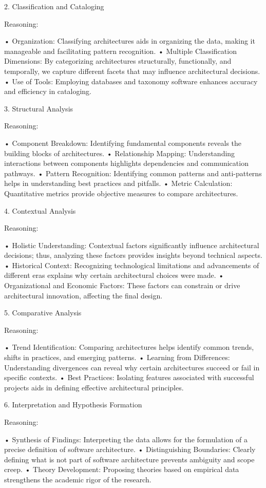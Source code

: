 2. Classification and Cataloging

Reasoning:

	•	Organization: Classifying architectures aids in organizing the data, making it manageable and facilitating pattern recognition.
	•	Multiple Classification Dimensions: By categorizing architectures structurally, functionally, and temporally, we capture different facets that may influence architectural decisions.
	•	Use of Tools: Employing databases and taxonomy software enhances accuracy and efficiency in cataloging.

3. Structural Analysis

Reasoning:

	•	Component Breakdown: Identifying fundamental components reveals the building blocks of architectures.
	•	Relationship Mapping: Understanding interactions between components highlights dependencies and communication pathways.
	•	Pattern Recognition: Identifying common patterns and anti-patterns helps in understanding best practices and pitfalls.
	•	Metric Calculation: Quantitative metrics provide objective measures to compare architectures.

4. Contextual Analysis

Reasoning:

	•	Holistic Understanding: Contextual factors significantly influence architectural decisions; thus, analyzing these factors provides insights beyond technical aspects.
	•	Historical Context: Recognizing technological limitations and advancements of different eras explains why certain architectural choices were made.
	•	Organizational and Economic Factors: These factors can constrain or drive architectural innovation, affecting the final design.

5. Comparative Analysis

Reasoning:

	•	Trend Identification: Comparing architectures helps identify common trends, shifts in practices, and emerging patterns.
	•	Learning from Differences: Understanding divergences can reveal why certain architectures succeed or fail in specific contexts.
	•	Best Practices: Isolating features associated with successful projects aids in defining effective architectural principles.

6. Interpretation and Hypothesis Formation

Reasoning:

	•	Synthesis of Findings: Interpreting the data allows for the formulation of a precise definition of software architecture.
	•	Distinguishing Boundaries: Clearly defining what is not part of software architecture prevents ambiguity and scope creep.
	•	Theory Development: Proposing theories based on empirical data strengthens the academic rigor of the research.

